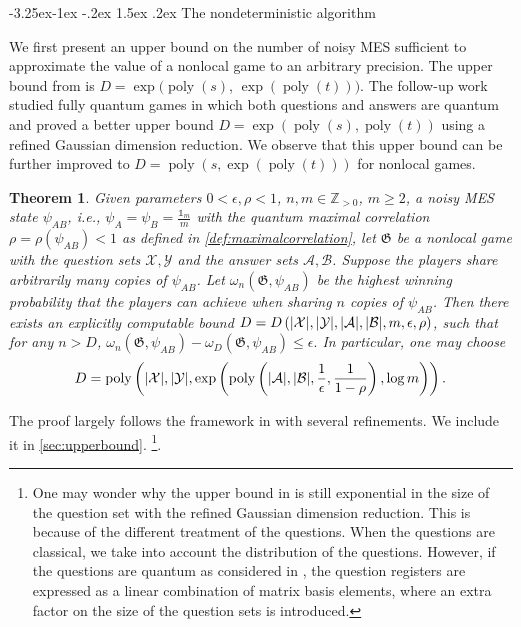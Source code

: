\documentclass[11pt]{article}
\makeatletter
\renewcommand{\subsection}{\@startsection{subsection}{2}{\z@}%
             {-3.25ex\@plus -1ex \@minus -.2ex}%
             {1.5ex \@plus .2ex}%
             {\normalfont\large\scshape\bfseries}}
\theoremstyle{plain}
\newtheorem{theorem}{Theorem}[section]
\theoremstyle{definition}
\newcommand {\br} [1] {\ensuremath{ \left( #1 \right) }}
\DeclarePairedDelimiter{\abs}{\lvert}{\rvert}
\newcommand {\id} {\ensuremath{\mathds{1}}}
\newcommand{\posint}{{\mathbb Z}_{>0}}
\newcommand{\poly} {\ensuremath{\operatorname{poly}}}
\newcommand{\calX}{\mathcal{X}}
\newcommand{\calY}{\mathcal{Y}}
\newcommand{\calA}{\mathcal{A}}
\newcommand{\calB}{\mathcal{B}}
\newcommand{\1}{\mathbb{1}} %
\makeatother
\begin{document}
\subsection{The nondeterministic algorithm}
\label{sec:noisy_alg}

We first present an upper bound on the number of noisy MES sufficient to approximate the value of a nonlocal game to an arbitrary precision. 
The upper bound from \cite{qin2021nonlocal} is $D=\exp(\poly(s)$, $\exp\br{\poly(t)})$.
The follow-up work~\cite{qin_et_al:LIPIcs.ICALP.2023.97} studied fully quantum games in which both questions and answers are quantum and proved a better upper bound  $D=\exp\br{\poly(s),\poly(t)}$ using a refined Gaussian dimension reduction. We observe that this upper bound can be further improved to $D=\poly\br{s,\exp\br{\poly(t)}}$ for nonlocal games.
\begin{theorem}\label{thm:upperbound}
		Given parameters $0<\epsilon,\rho<1$, $n,m\in\posint$, $m\geq 2$, a noisy MES state $\psi_{AB}$, i.e.,  $\psi_A=\psi_B=\frac{\id_m}{m}$ with the quantum maximal correlation $\rho=\rho\br{\psi_{AB}}<1$
		as defined in \cref{def:maximalcorrelation}, let $\mathfrak{G}$  be a nonlocal game with the question sets $\calX,\calY$ and the answer sets $\calA,\calB$. Suppose the players share arbitrarily many copies of $\psi_{AB}$. Let $\omega_n(\mathfrak{G},\psi_{AB})$ be the highest winning probability that the players can achieve when sharing $n$ copies of $\psi_{AB}$. Then there exists an explicitly computable bound $D=D\br{\abs{\calX},\abs{\calY},\abs{\calA},\abs{\calB},m,\epsilon,\rho}$, such that 
		for any $n>D$, $\omega_n(\mathfrak{G},\psi_{AB})-\omega_D(\mathfrak{G},\psi_{AB})\leq\epsilon.$
		In particular, one may choose
		$$D=\mathrm{poly}\br{\abs{\calX},\abs{\calY}, \exp\br{\mathrm{poly}\br{\abs{\calA},\abs{\calB},\frac{1}{\epsilon},\frac{1}{1-\rho}},\log m}}.$$
	\end{theorem}
 The proof largely follows the framework in \cite{qin2021nonlocal} with several refinements. We include it in \cref{sec:upperbound}. \footnote{One may wonder why the upper bound in \cite{qin_et_al:LIPIcs.ICALP.2023.97} is still exponential in the size of the question set with the refined Gaussian dimension reduction. This is because of the different treatment of the questions. When the questions are classical, we take into account the distribution of the questions. However, if the questions are quantum as considered in \cite{qin_et_al:LIPIcs.ICALP.2023.97}, the question registers are expressed as a linear combination of matrix basis elements, where an extra factor on the size of the question sets is introduced.}. 
\end{document}
